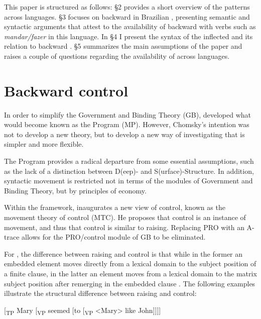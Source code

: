 \documentclass[output=paper]{langsci/langscibook}
\begin{document}
This paper is structured as follows: §2 provides a short overview of the  patterns across languages. §3 focuses on backward  in Brazilian , presenting semantic and syntactic arguments that attest to the availability of backward  with verbs such as \textit{mandar\slash fazer} in this language. In §4 I present the syntax of the inflected  and its relation to backward . §5 summarizes the main assumptions of the paper and raises a couple of questions regarding the availability of  across languages.

\section{Backward control}%

In order to simplify the Government and Binding Theory (GB), \citet{Chomsky1993} developed what would become known as the  Program (MP). However, Chomsky’s intention was not to develop a new theory, but to develop a new way of investigating that is simpler and more flexible.

The  Program provides a radical departure from some essential assumptions, such as the lack of a distinction between D(eep)- and S(urface)-Structure. In addition, syntactic movement is restricted not in terms of the modules of Government and Binding Theory, but by principles of economy. 

Within the  framework, \citet{Hornstein1999,Hornstein2001} inaugurates a new view of control, known as the movement theory of control (MTC). He proposes that control is an instance of movement, and thus that control is similar to raising. Replacing PRO with an A-trace allows for the PRO\slash control module of GB to be eliminated.

For \citet{Hornstein1999}, the difference between raising and control is that while in the former an embedded element moves directly from a lexical domain to the subject position of a finite clause, in the latter an element moves from a lexical domain to the matrix subject position after remerging in the embedded clause \citep{Boeckx2006}. The following examples illustrate the structural difference between raising and control:

\ea%
    \label{ex:moreno:3b}
[\textsubscript{TP} Mary [\textsubscript{VP} seemed [to [\textsubscript{VP} <Mary> like John]]]]
\z
\end{document}

